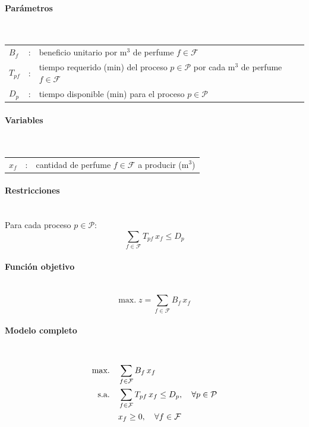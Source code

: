 \paragraph{Parámetros}\mbox{}\\
\begin{tabular}{lcl}
$B_f$ & : & beneficio unitario por m$^3$ de perfume $f \in \mathcal{F}$ \\
$T_{pf}$ & : & tiempo requerido (min) del proceso $p \in \mathcal{P}$ por cada m$^3$ de perfume $f \in \mathcal{F}$ \\
$D_p$ & : & tiempo disponible (min) para el proceso $p \in \mathcal{P}$ \\
\end{tabular}

\paragraph{Variables}\mbox{}\\
\begin{tabular}{lcl}
$x_f$ & : & cantidad de perfume $f \in \mathcal{F}$ a producir (m$^3$) \\
\end{tabular}

\paragraph{Restricciones}\mbox{}\\
Para cada proceso $p \in \mathcal{P}$:
\begin{equation}
\sum_{f \in \mathcal{F}} T_{pf}\,x_f \leq D_p
\end{equation}

\paragraph{Función objetivo}\mbox{}\\
\begin{equation}
\mbox{max.}\; z = \sum_{f \in \mathcal{F}} B_f\,x_f
\end{equation}

\paragraph{Modelo completo}\mbox{}\\
\begin{align}
\mbox{max.}\quad & \sum_{f \in \mathcal{F}} B_f\,x_f \notag \\
\mbox{s.a.}\quad
& \sum_{f \in \mathcal{F}} T_{pf}\,x_f \leq D_p, \quad \forall p \in \mathcal{P} \notag \\
& x_f \geq 0, \quad \forall f \in \mathcal{F}
\end{align}
